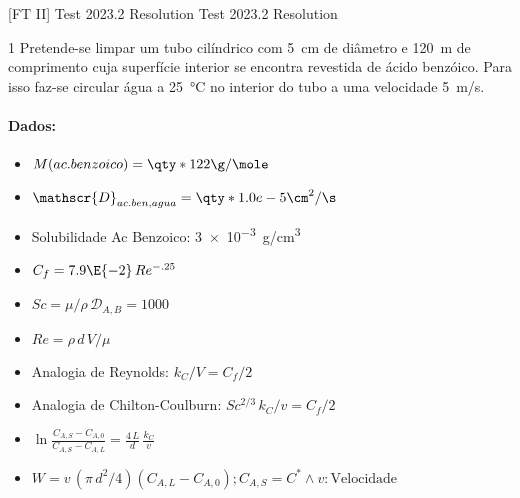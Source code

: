\documentclass[\mainfilename]{subfiles}
\begin{document}

\Large

[FT II]
{Test 2023.2 Resolution} %
{Test 2023.2 Resolution} %

\begin{questionBox}1{ %
    Pretende-se limpar um tubo cilíndrico com \qty*{5}{\cm} de diâmetro e \qty*{120}{\m} de comprimento cuja superfície interior se encontra revestida de ácido benzóico. Para isso faz-se circular água a \qty*{25}{\celsius} no interior do tubo a uma velocidade \qty*{5}{\m/\s}.
} %
    \paragraph*{Dados:}
    \begin{itemize}
        \item \(M(ac. benzoico) = \qty*{122}{\g/\mole}\)
        \item \(\mathscr{D}_{ac.ben,agua}=\qty*{1.0e-5}{\cm^2/\s}\)
        \item Solubilidade Ac Benzoico: \qty*{3e-3}{\g/\cm^3}
        \item \(C_f=7.9\E{-2}\,Re^{-.25}\)
        \item \(Sc=\mu/\rho\,\mathscr{D}_{A,B}=1000\)
        \item \(Re=\rho\,d\,V/\mu\)
        \item Analogia de Reynolds: \(k_C/V=C_f/2\)
        \item Analogia de Chilton-Coulburn: \(Sc^{2/3}\,k_C/v=C_f/2\)
        \item \(
            \ln{\frac
                {C_{A,S}-C_{A,0}}
                {C_{A,S}-C_{A,L}}
            }
            = \frac{4\,L}{d}
            \,\frac{k_C}{v}
        \)
        \item \(W=v\,(\pi\,d^2/4)(C_{A,L}-C_{A,0}); C_{A,S}=C^*\land v:\text{Velocidade}\)
    \end{itemize}
\end{questionBox}
\end{document}

